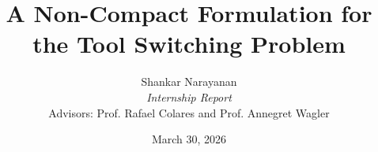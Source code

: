 \documentclass[12pt]{article}
\begin{document}
	
	\title{A Non-Compact Formulation for the Tool Switching Problem}
	\author{Shankar Narayanan \\
		\textit{Internship Report} \\
		Advisors: Prof. Rafael Colares and Prof. Annegret Wagler}
	\date{March 30, 2026}
	\maketitle
	
	
	

	
	
%	
%	
%	
%	
\end{document}

